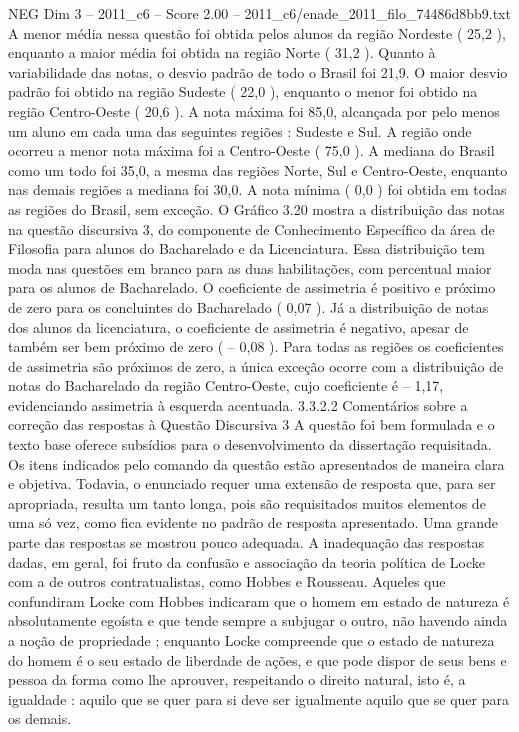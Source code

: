 \begin{textsample}{NEG Dim 3 – 2011\_c6 – Score 2.00 – 2011\_c6/enade\_2011\_filo\_74486d8bb9.txt}
A menor média nessa questão foi obtida pelos alunos da região Nordeste ( 25,2 ), enquanto a maior média foi obtida na região Norte ( 31,2 ).
Quanto à variabilidade das notas, o desvio padrão de todo o Brasil foi 21,9.
O maior desvio padrão foi obtido na região Sudeste ( 22,0 ), enquanto o menor foi obtido na região Centro-Oeste ( 20,6 ).
A nota máxima foi 85,0, alcançada por pelo menos um aluno em cada uma das seguintes regiões : Sudeste e Sul.
A região onde ocorreu a menor nota máxima foi a Centro-Oeste ( 75,0 ).
A mediana do Brasil como um todo foi 35,0, a mesma das regiões Norte, Sul e Centro-Oeste, enquanto nas demais regiões a mediana foi 30,0.
A nota mínima ( 0,0 ) foi obtida em todas as regiões do Brasil, sem exceção.
O Gráfico 3.20 mostra a distribuição das notas na questão discursiva 3, do componente de Conhecimento Específico da área de Filosofia para alunos do Bacharelado e da Licenciatura.
Essa distribuição tem moda nas questões em branco para as duas habilitações, com percentual maior para os alunos de Bacharelado.
O coeficiente de assimetria é positivo e próximo de zero para os concluintes do Bacharelado ( 0,07 ).
Já a distribuição de notas dos alunos da licenciatura, o coeficiente de assimetria é negativo, apesar de também ser bem próximo de zero ( – 0,08 ).
Para todas as regiões os coeficientes de assimetria são próximos de zero, a única exceção ocorre com a distribuição de notas do Bacharelado da região Centro-Oeste, cujo coeficiente é – 1,17, evidenciando assimetria à esquerda acentuada. 3.3.2.2 Comentários sobre a correção das respostas à Questão Discursiva 3 A questão foi bem formulada e o texto base oferece subsídios para o desenvolvimento da dissertação requisitada.
Os itens indicados pelo comando da questão estão apresentados de maneira clara e objetiva.
Todavia, o enunciado requer uma extensão de resposta que, para ser apropriada, resulta um tanto longa, pois são requisitados muitos elementos de uma só vez, como fica evidente no padrão de resposta apresentado.
Uma grande parte das respostas se mostrou pouco adequada.
A inadequação das respostas dadas, em geral, foi fruto da confusão e associação da teoria política de Locke com a de outros contratualistas, como Hobbes e Rousseau.
Aqueles que confundiram Locke com Hobbes indicaram que o homem em estado de natureza é absolutamente egoísta e que tende sempre a subjugar o outro, não havendo ainda a noção de propriedade ; enquanto Locke compreende que o estado de natureza do homem é o seu estado de liberdade de ações, e que pode dispor de seus bens e pessoa da forma como lhe aprouver, respeitando o direito natural, isto é, a igualdade : aquilo que se quer para si deve ser igualmente aquilo que se quer para os demais.

\end{textsample}
